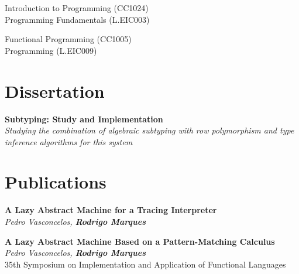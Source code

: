 \documentclass[11pt,a4paper]{moderncv}
\begin{document}
\begin{description}[labelwidth=60pt,align=right,leftmargin=!]
    \item[\normalfont{\emph{Fall 2023}}] Introduction to Programming (CC1024)\\
                                         Programming Fundamentals (L.EIC003)
    \item[\normalfont{\emph{Spring 2024}}] Functional Programming (CC1005)\\
                                         Programming (L.EIC009)                                         
\end{description}


\section{Dissertation}

\begin{description}[labelwidth=60pt,align=right,leftmargin=!]
    \item[\normalfont{\emph{MSc}}] \textbf{Subtyping: Study and Implementation}
                                \\ \emph{Studying the combination of algebraic subtyping with row polymorphism and type inference algorithms for this system}
\end{description}


\section{Publications}
\begin{description}[labelwidth=60pt,align=right,leftmargin=!]
    \item[\normalfont{\emph{Draft}}] \textbf{A Lazy Abstract Machine for a Tracing Interpreter}
                                        \\ \emph{Pedro Vasconcelos, \textbf{Rodrigo Marques}}

    \item[\normalfont{\emph{IFL 2023}}] \textbf{A Lazy Abstract Machine Based on a Pattern-Matching Calculus}
                                    \\ \emph{Pedro Vasconcelos, \textbf{Rodrigo Marques}}
                                    \\ 35th Symposium on Implementation and Application of Functional Languages
\end{description}
\end{document}
